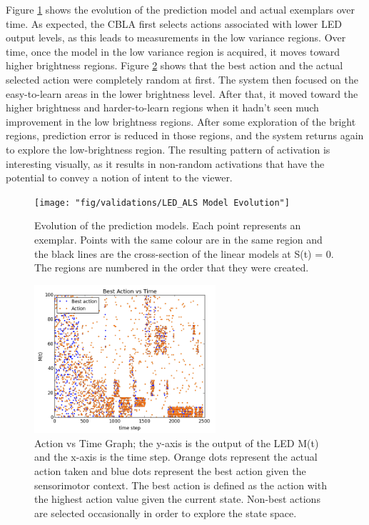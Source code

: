 Figure \ref{fig:LED_ALS Model Evolution} shows the evolution of the prediction model and actual exemplars over time. As expected, the CBLA first selects actions associated with lower LED output levels, as this leads to measurements in the low variance regions. Over time, once the model in the low variance region is acquired, it moves toward higher brightness regions. Figure \ref{fig:LED_ALS Action Selection} shows that the best action and the actual selected action were completely random at first. The system then focused on the easy-to-learn areas in the lower brightness level. After that, it moved toward the higher brightness and harder-to-learn regions when it hadn't seen much improvement in the low brightness regions. After some exploration of the bright regions, prediction error is reduced in those regions, and the system returns again to explore the low-brightness region.  The resulting pattern of activation is interesting visually, as it results in non-random activations that have the potential to convey a notion of intent to the viewer. 


 
\begin{figure} 
	\centering
	\texttt{[image: "fig/validations/LED\_ALS Model Evolution"]}
	\caption[Evolution of the prediction models]{Evolution of the prediction models. Each point represents an exemplar. Points with the same colour are in the same region and the black lines are the cross-section of the linear models at S(t) = 0. The regions are numbered in the order that they were created. }
	\label{fig:LED_ALS Model Evolution}
\end{figure}

\begin{figure}
	\centering
	\includegraphics[width=0.6\textwidth]{"fig/validations/LED_ALS Action Selection"}
	\caption[Action vs Time Graph]{Action vs Time Graph; the y-axis is the output of the LED M(t) and the x-axis is the time step. Orange dots represent the actual action taken and blue dots represent the best action given the sensorimotor context. The best action is defined as the action with the highest action value given the current state. Non-best actions are selected occasionally in order to explore the state space.}
	\label{fig:LED_ALS Action Selection}
\end{figure}


